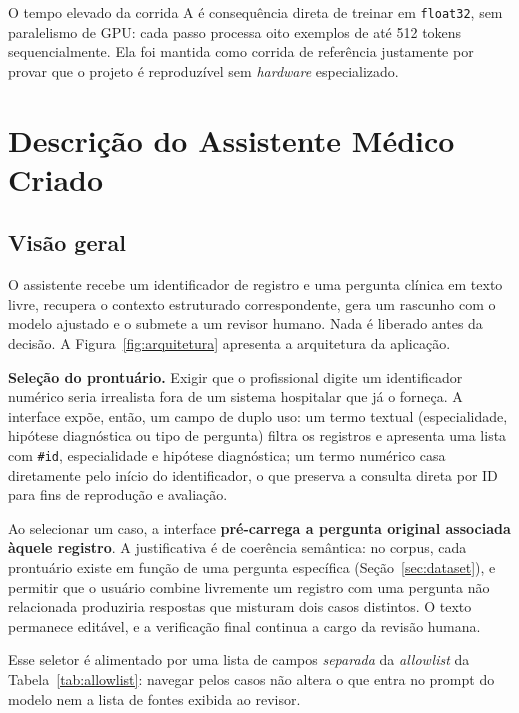 \documentclass[12pt,a4paper]{article}
\begin{document}
O tempo elevado da corrida A é consequência direta de treinar em
\texttt{float32}, sem paralelismo de GPU: cada passo processa oito exemplos de
até 512 tokens sequencialmente. Ela foi mantida como corrida de referência
justamente por provar que o projeto é reproduzível sem \emph{hardware}
especializado.

\section{Descrição do Assistente Médico Criado}
\label{sec:assistente}

\subsection{Visão geral}

O assistente recebe um identificador de registro e uma pergunta clínica em texto
livre, recupera o contexto estruturado correspondente, gera um rascunho com o
modelo ajustado e o submete a um revisor humano. Nada é liberado antes da
decisão. A Figura~\ref{fig:arquitetura} apresenta a arquitetura da aplicação.

\medskip
\noindent\textbf{Seleção do prontuário.} Exigir que o profissional digite um
identificador numérico seria irrealista fora de um sistema hospitalar que já o
forneça. A interface expõe, então, um campo de duplo uso: um termo textual
(especialidade, hipótese diagnóstica ou tipo de pergunta) filtra os registros e
apresenta uma lista com \texttt{\#id}, especialidade e hipótese diagnóstica; um termo numérico
casa diretamente pelo início do identificador, o que preserva a consulta direta
por ID para fins de reprodução e avaliação.

Ao selecionar um caso, a interface \textbf{pré-carrega a pergunta original
associada àquele registro}. A justificativa é de coerência semântica: no corpus,
cada prontuário existe em função de uma pergunta específica
(Seção~\ref{sec:dataset}), e permitir que o usuário combine livremente um
registro com uma pergunta não relacionada produziria respostas que misturam dois
casos distintos. O texto permanece editável, e a verificação final continua a
cargo da revisão humana.

Esse seletor é alimentado por uma lista de campos \emph{separada} da
\emph{allowlist} da Tabela~\ref{tab:allowlist}: navegar pelos casos não altera o
que entra no prompt do modelo nem a lista de fontes exibida ao revisor.
\end{document}
